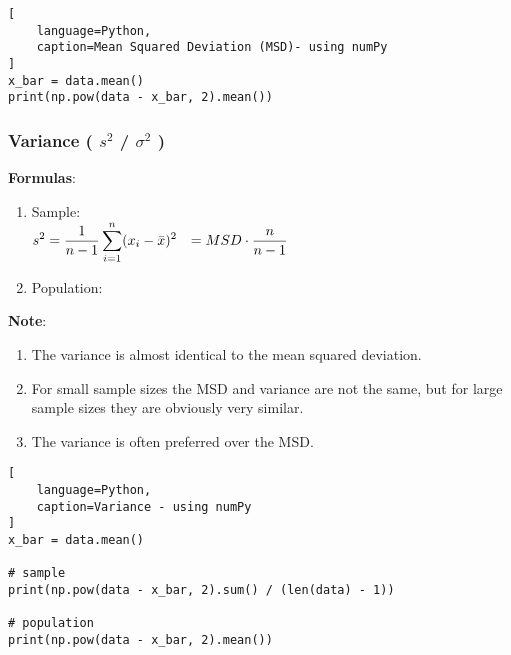 \begin{lstlisting}[
    language=Python, 
    caption=Mean Squared Deviation (MSD)- using numPy
]
x_bar = data.mean()
print(np.pow(data - x_bar, 2).mean())
\end{lstlisting}


\subsubsection{Variance ( $s^2$ / $\sigma^2$ ) \cite{statistics/book/Statistics-for-Data-Scientists/Maurits-Kaptein}} \label{Data/Describing Data/Central Tendency/Variance}

\textbf{Formulas}:
\begin{enumerate}
    \item Sample:
    \label{Data/Describing Data/Central Tendency/Variance/sample} \\
        $
            \begin{aligned}
                s^2 
                &= \dfrac{1}{n-1} \displaystyle\sum_{i=1}^{n} (x_i - \bar{x})^2
                &= MSD \cdot \dfrac{n}{n-1}
            \end{aligned}
        $

    \item Population:
\end{enumerate}

\vspace{0.2cm}
\textbf{Note}:
\begin{enumerate}
    \item The variance is almost identical to the mean squared deviation. \hfill \cite{statistics/book/Statistics-for-Data-Scientists/Maurits-Kaptein}

    \item For small sample sizes the MSD and variance are not the same, but for large sample sizes they are obviously very similar. \hfill \cite{statistics/book/Statistics-for-Data-Scientists/Maurits-Kaptein}
    
    \item The variance is often preferred over the MSD. \hfill \cite{statistics/book/Statistics-for-Data-Scientists/Maurits-Kaptein}
\end{enumerate}


\begin{lstlisting}[
    language=Python, 
    caption=Variance - using numPy
]
x_bar = data.mean()

# sample
print(np.pow(data - x_bar, 2).sum() / (len(data) - 1))

# population
print(np.pow(data - x_bar, 2).mean())
\end{lstlisting}


